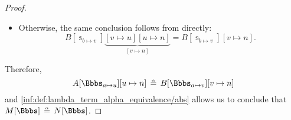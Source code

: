 \begin{proof}
\begin{itemize}
    \item Otherwise, the same conclusion follows from  directly:
    \begin{equation*}
      B[\Bbbs_{b \mapsto v}]\underbrace{[v \mapsto u][u \mapsto n]}_{[v \mapsto n]} = B[\Bbbs_{b \mapsto v}][v \mapsto n].
    \end{equation*}
  \end{itemize}

  Therefore,
  \begin{equation*}
    A[\Bbbs_{a \mapsto u}][u \mapsto n]
    \aequiv
    B[\Bbbs_{a \mapsto v}][v \mapsto n]
  \end{equation*}
  and \ref{inf:def:lambda_term_alpha_equivalence/abs} allows us to conclude that \( M[\Bbbs] \aequiv N[\Bbbs] \).
\end{proof}

